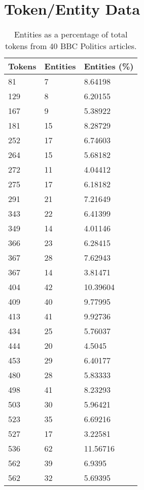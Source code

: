 \section{Token/Entity Data}
\begin{longtable}[c]{|l|l|l|}
\caption{Entities as a percentage of total tokens from 40 BBC Politics articles.}\label{tab:entitiestokens}\\
\hline
Tokens & Entities & Entities (\%) \\
\hline\hline\endhead
81     & 7        & 8.64198       \\
129    & 8        & 6.20155       \\
167    & 9        & 5.38922       \\
181    & 15       & 8.28729       \\
252    & 17       & 6.74603       \\
264    & 15       & 5.68182       \\
272    & 11       & 4.04412       \\
275    & 17       & 6.18182       \\
291    & 21       & 7.21649       \\
343    & 22       & 6.41399       \\
349    & 14       & 4.01146       \\
366    & 23       & 6.28415       \\
367    & 28       & 7.62943       \\
367    & 14       & 3.81471       \\
404    & 42       & 10.39604      \\
409    & 40       & 9.77995       \\
413    & 41       & 9.92736       \\
434    & 25       & 5.76037       \\
444    & 20       & 4.5045        \\
453    & 29       & 6.40177       \\
480    & 28       & 5.83333       \\
498    & 41       & 8.23293       \\
503    & 30       & 5.96421       \\
523    & 35       & 6.69216       \\
527    & 17       & 3.22581       \\
536    & 62       & 11.56716      \\
562    & 39       & 6.9395        \\
562    & 32       & 5.69395       \\

\end{longtable}
